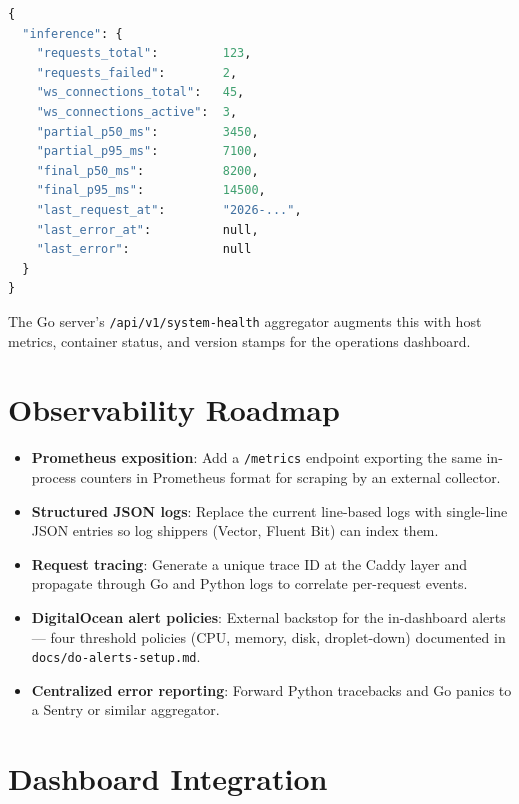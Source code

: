 \begin{lstlisting}[language=Python, caption={Metrics snapshot returned by Python /health}]
{
  "inference": {
    "requests_total":         123,
    "requests_failed":        2,
    "ws_connections_total":   45,
    "ws_connections_active":  3,
    "partial_p50_ms":         3450,
    "partial_p95_ms":         7100,
    "final_p50_ms":           8200,
    "final_p95_ms":           14500,
    "last_request_at":        "2026-...",
    "last_error_at":          null,
    "last_error":             null
  }
}
\end{lstlisting}

The Go server's \texttt{/api/v1/system-health} aggregator augments this with host metrics, container status, and version stamps for the operations dashboard.

\section{Observability Roadmap}

\begin{goldbox}[title=Proposed Observability Enhancements]
\begin{itemize}
  \item \textbf{Prometheus exposition}: Add a \texttt{/metrics} endpoint exporting the same in-process counters in Prometheus format for scraping by an external collector.
  \item \textbf{Structured JSON logs}: Replace the current line-based logs with single-line JSON entries so log shippers (Vector, Fluent Bit) can index them.
  \item \textbf{Request tracing}: Generate a unique trace ID at the Caddy layer and propagate through Go and Python logs to correlate per-request events.
  \item \textbf{DigitalOcean alert policies}: External backstop for the in-dashboard alerts --- four threshold policies (CPU, memory, disk, droplet-down) documented in \texttt{docs/do-alerts-setup.md}.
  \item \textbf{Centralized error reporting}: Forward Python tracebacks and Go panics to a Sentry or similar aggregator.
\end{itemize}
\end{goldbox}

\section{Dashboard Integration}

